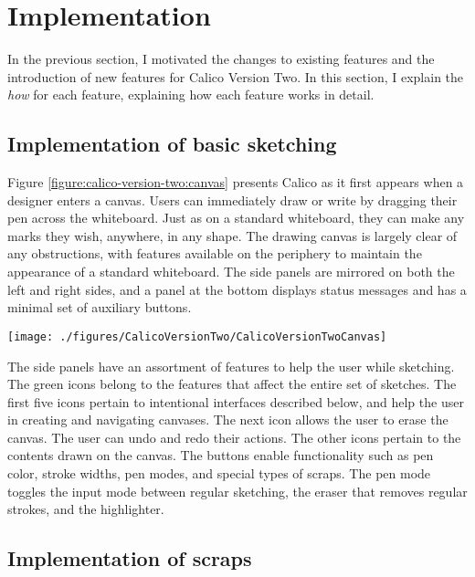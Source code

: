 \documentclass[12pt,fleqn]{ucithesis}
\begin{document}
\section{Implementation}
\label{chapter:calico-version-two:implementation}

In the previous section, I motivated the changes to existing features and the introduction of new features for Calico Version Two. In this section, I explain the \emph{how} for each feature, explaining how each feature works in detail.

\subsection{Implementation of basic sketching}

Figure \ref{figure:calico-version-two:canvas} presents Calico as it first appears when a designer enters a canvas. Users can immediately draw or write by dragging their pen across the whiteboard. Just as on a standard whiteboard, they can make any marks they wish, anywhere, in any shape. The drawing canvas is largely clear of any obstructions, with features available on the periphery to maintain the appearance of a standard whiteboard. The side panels are mirrored on both the left and right sides, and a panel at the bottom displays status messages and has a minimal set of auxiliary buttons. 

\begin{figure*}[tbh]
  \centering
  \texttt{[image: ./figures/CalicoVersionTwo/CalicoVersionTwoCanvas]}
  \caption{The Calico canvas interface, including the side panels and the drawing space.}
  \label{figure:calico-version-two:canvas}
\end{figure*}

The side panels have an assortment of features to help the user while sketching. The green icons belong to the features that affect the entire set of sketches. The first five icons pertain to intentional interfaces described below, and help the user in creating and navigating canvases. The next icon allows the user to erase the canvas. The user can undo and redo their actions. The other icons pertain to the contents drawn on the canvas. The buttons enable functionality such as pen color, stroke widths, pen modes, and special types of scraps. The pen mode toggles the input mode between regular sketching, the eraser that removes regular strokes, and the highlighter.  

\subsection{Implementation of scraps}
\end{document}
